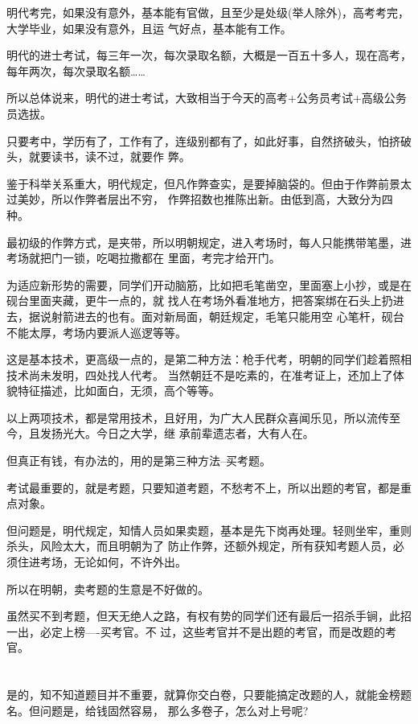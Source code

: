 \documentclass[11pt,a4paper,onecolumn]{article}
\begin{document}
明代考完，如果没有意外，基本能有官做，且至少是处级(举人除外)，高考考完，大学毕业，如果没有意外，且运
气好点，基本能有工作。

明代的进士考试，每三年一次，每次录取名额，大概是一百五十多人，现在高考，每年两次，每次录取名额……

所以总体说来，明代的进士考试，大致相当于今天的高考+公务员考试+高级公务员选拔。

只要考中，学历有了，工作有了，连级别都有了，如此好事，自然挤破头，怕挤破头，就要读书，读不过，就要作
弊。

鉴于科举关系重大，明代规定，但凡作弊查实，是要掉脑袋的。但由于作弊前景太过美妙，所以作弊者层出不穷，
作弊招数也推陈出新。由低到高，大致分为四种。

最初级的作弊方式，是夹带，所以明朝规定，进入考场时，每人只能携带笔墨，进考场就把门一锁，吃喝拉撒都在
里面，考完才给开门。

为适应新形势的需要，同学们开动脑筋，比如把毛笔凿空，里面塞上小抄，或是在砚台里面夹藏，更牛一点的，就
找人在考场外看准地方，把答案绑在石头上扔进去，据说射箭进去的也有。面对新局面，朝廷规定，毛笔只能用空
心笔杆，砚台不能太厚，考场内要派人巡逻等等。

这是基本技术，更高级一点的，是第二种方法：枪手代考，明朝的同学们趁着照相技术尚未发明，四处找人代考。
当然朝廷不是吃素的，在准考证上，还加上了体貌特征描述，比如面白，无须，高个等等。

以上两项技术，都是常用技术，且好用，为广大人民群众喜闻乐见，所以流传至今，且发扬光大。今日之大学，继
承前辈遗志者，大有人在。

但真正有钱，有办法的，用的是第三种方法--买考题。

考试最重要的，就是考题，只要知道考题，不愁考不上，所以出题的考官，都是重点对象。

但问题是，明代规定，知情人员如果卖题，基本是先下岗再处理。轻则坐牢，重则杀头，风险太大，而且明朝为了
防止作弊，还额外规定，所有获知考题人员，必须住进考场，无论如何，不许外出。

所以在明朝，卖考题的生意是不好做的。

虽然买不到考题，但天无绝人之路，有权有势的同学们还有最后一招杀手锏，此招一出，必定上榜----买考官。不
过，这些考官并不是出题的考官，而是改题的考官。

\section[\thesection]{}

是的，知不知道题目并不重要，就算你交白卷，只要能搞定改题的人，就能金榜题名。但问题是，给钱固然容易，
那么多卷子，怎么对上号呢?
\end{document}
